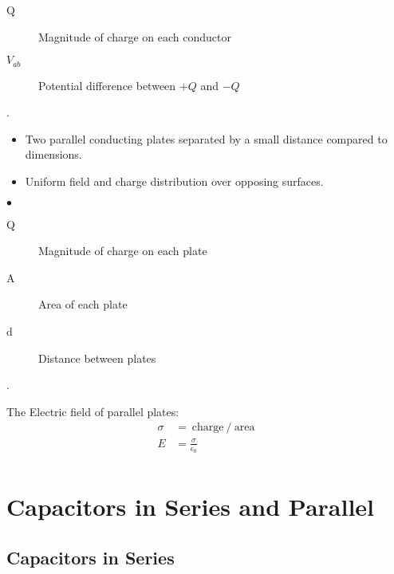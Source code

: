 
\begin{description}
	\item[Q] Magnitude of charge on each conductor
	\item[$V_{ab}$] Potential difference between $+Q$ and $-Q$
\end{description}


\begin{definition}.

	\begin{itemize}
		\item Two parallel conducting plates separated by a small distance compared to dimensions.
		\item Uniform field and charge distribution over opposing surfaces.
	\end{itemize}
\smallskip\hfill$\bullet$\end{definition}



\begin{description}
	\item[Q] Magnitude of charge on each plate
	\item[A] Area of each plate
	\item[d] Distance between plates
\end{description}

.

The Electric field of parallel plates:
\begin{align*}
	\sigma &=   \:\text{charge}\:/\:\text{area}\:\\
	E &= \frac{\sigma}{\epsilon_0} \\
\end{align*}

\section{Capacitors in Series and Parallel}%
\label{sec:capacitors_in_series_and_parallel}


\subsection{Capacitors in Series}%
\label{sub:capacitors_in_series}

